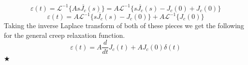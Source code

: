 \documentclass[preprint,12pt,authoryear]{elsarticle}
\begin{document}
\begin{equation}
    \varepsilon(t) = \mathcal{L}^{-1}\{ A s \overline{J_c}(s) \} = A \mathcal{L}^{-1}\{s \overline{J_c}(s)  - J_c(0) + J_c(0)\}
\end{equation}
\begin{equation}
    \varepsilon(t) = A \mathcal{L}^{-1}\{s \overline{J_c}(s)  - J_c(0) \} + A\mathcal{L}^{-1} \{J_c(0)\}
\end{equation}
Taking the inverse Laplace transform of both of these pieces we get the following for the general creep relaxation function.
\begin{equation}
    \varepsilon(t) = A \frac{d}{dt}J_c(t) + AJ_c(0)\delta(t)
\end{equation}
\hspace*{\fill} $\bigstar$
\medskip
\end{document}
